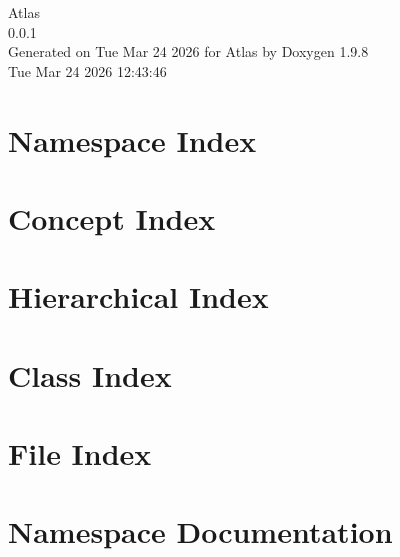 \documentclass[twoside]{book}
\newcommand{\+}{\discretionary{\mbox{\scriptsize$\hookleftarrow$}}{}{}}
\newcommand{\clearemptydoublepage}{%
    \newpage{\pagestyle{empty}\cleardoublepage}%
  }
\begin{document}
  \raggedbottom
    \hypersetup{pageanchor=false,
                bookmarksnumbered=true,
                pdfencoding=unicode
               }
  \begin{titlepage}
  \vspace*{7cm}
  \begin{center}%
  {\Large Atlas}\\
  [1ex]\large 0.\+0.\+1 \\
  \vspace*{1cm}
  {\large Generated on Tue Mar 24 2026 for Atlas by Doxygen 1.9.8}\\
    \vspace*{0.5cm}
    {\small Tue Mar 24 2026 12:43:46}
  \end{center}
  \end{titlepage}
  \clearemptydoublepage
  \tableofcontents
  \clearemptydoublepage
  \hypersetup{pageanchor=true}





\chapter{Namespace Index}

\chapter{Concept Index}

\chapter{Hierarchical Index}

\chapter{Class Index}

\chapter{File Index}

\chapter{Namespace Documentation}













\end{document}
